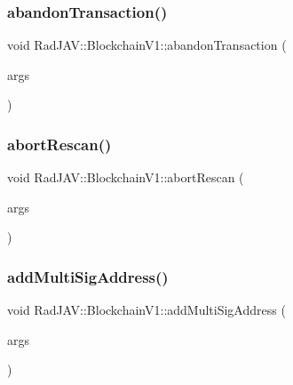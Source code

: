 \subsubsection{\texorpdfstring{abandon\+Transaction()}{abandonTransaction()}}
{\footnotesize\ttfamily void Rad\+J\+A\+V\+::\+Blockchain\+V1\+::abandon\+Transaction (\begin{DoxyParamCaption}\item[{const v8\+::\+Function\+Callback\+Info$<$ v8\+::\+Value $>$ \&}]{args }\end{DoxyParamCaption})\hspace{0.3cm}{\ttfamily [static]}}

\mbox{\label{class_rad_j_a_v_1_1_blockchain_v1_a39f525753968dbcd98ede6bd29eafb76}} 
\subsubsection{\texorpdfstring{abort\+Rescan()}{abortRescan()}}
{\footnotesize\ttfamily void Rad\+J\+A\+V\+::\+Blockchain\+V1\+::abort\+Rescan (\begin{DoxyParamCaption}\item[{const v8\+::\+Function\+Callback\+Info$<$ v8\+::\+Value $>$ \&}]{args }\end{DoxyParamCaption})\hspace{0.3cm}{\ttfamily [static]}}

\mbox{\label{class_rad_j_a_v_1_1_blockchain_v1_a5bc10bfb78a9c35453c7d6076b50d17e}} 
\subsubsection{\texorpdfstring{add\+Multi\+Sig\+Address()}{addMultiSigAddress()}}
{\footnotesize\ttfamily void Rad\+J\+A\+V\+::\+Blockchain\+V1\+::add\+Multi\+Sig\+Address (\begin{DoxyParamCaption}\item[{const v8\+::\+Function\+Callback\+Info$<$ v8\+::\+Value $>$ \&}]{args }\end{DoxyParamCaption})\hspace{0.3cm}{\ttfamily [static]}}

